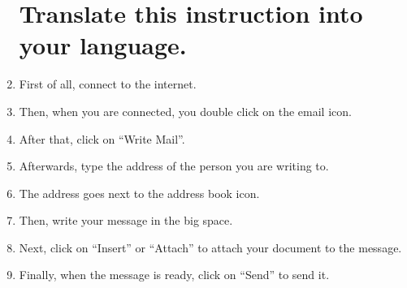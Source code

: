 \documentclass[a5paper, 10pt, final]{extreport}
\begin{document}
\begin{enumerate}
\section{Translate this instruction into your language.}
\item First of all, connect to the internet.
\item Then, when you are connected, you double click on the email icon.
\item After that, click on ``Write Mail''.
\item Afterwards, type the address of the person you are writing to.
\item The address goes next to the address book icon.
\item Then, write your message in the big space.
\item Next, click on ``Insert'' or ``Attach'' to attach your document to the message.
\item Finally, when the message is ready, click on ``Send'' to send it.
\end{enumerate}
\end{document}
